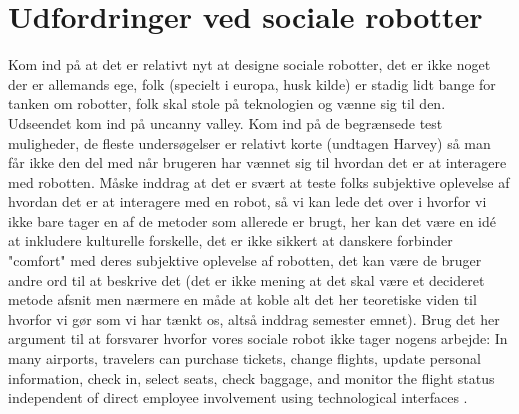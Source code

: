 \section{Udfordringer ved sociale robotter}
\label{UdfordringerSocialeRobotter}
%
Kom ind på at det er relativt nyt at designe sociale robotter, det er ikke noget der er allemands ege, folk (specielt i europa, husk kilde) er stadig lidt bange for tanken om robotter, folk skal stole på teknologien og vænne sig til den. Udseendet kom ind på uncanny valley. Kom ind på de begrænsede test muligheder, de fleste undersøgelser er relativt korte (undtagen Harvey) så man får ikke den del med når brugeren har vænnet sig til hvordan det er at interagere med robotten.  \blankline
%
Måske inddrag at det er svært at teste folks subjektive oplevelse af hvordan det er at interagere med en robot, så vi kan lede det over i hvorfor vi ikke bare tager en af de metoder som allerede er brugt, her kan det være en idé at inkludere kulturelle forskelle, det er ikke sikkert at danskere forbinder "comfort" med deres subjektive oplevelse af robotten, det kan være de bruger andre ord til at beskrive det (det er ikke mening at det skal være et decideret metode afsnit men nærmere en måde at koble alt det her teoretiske viden til hvorfor vi gør som vi har tænkt os, altså inddrag semester emnet).\blankline
%
Brug det her argument til at forsvarer hvorfor vores sociale robot ikke tager nogens arbejde: In many airports, travelers can purchase tickets, change flights, update personal information, check in, select seats, check baggage, and monitor the flight status independent of direct employee involvement using technological interfaces \textcite[s. 352]{PDF:TheImpactOfTraveler}.